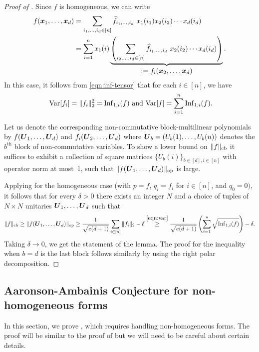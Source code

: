 \begin{proof}[Proof of ] 
Since $f$ is homogeneous, we can write
   \begin{align*}
    f(\boldsymbol{x}_1,\ldots, \boldsymbol{x}_d) &= \sum_{i_1, \ldots, i_d \in [n]} \widehat{f}_{i_1, \ldots, i_d} ~x_1(i_1)x_2(i_2)\cdots x_d({i_d}) \\
    \ & = \sum_{i=1}^n  x_1(i) \underbrace{\left(\sum_{i_2,\ldots, i_d \in [n]} \widehat{f}_{i_1, \ldots, i_d} ~x_2(i_2)\cdots x_d({i_d})\right)}_{\textstyle := f_i(\boldsymbol{x}_2,\ldots, \boldsymbol{x}_d)}.
\end{align*}
 In this case, it follows from \eqref{eqn:inf-tensor} that for each $i \in [n]$, we have 
 \begin{equation}\label{eqn:var}
     \ \mathrm{Var}[f_i] = \|f_i\|^2_2 = \mathrm{Inf}_{1,i}(f) \text{ and }  \mathrm{Var}[f] = \sum_{i=1}^n \mathrm{Inf}_{1,i}(f).
 \end{equation}

  Let us denote the corresponding non-commutative block-multilinear polynomials by $f(\boldsymbol{U}_1, \ldots, \boldsymbol{U}_d)$ and $f_i(\boldsymbol{U}_2, \ldots,\boldsymbol{U}_d)$ where $\boldsymbol{U}_b = (U_b(1), \ldots, U_b(n))$ denotes the $b^\text{th}$ block of non-commutative variables. To show a lower bound on $\|f\|_{\mathrm{cb}}$ it suffices to exhibit a collection of square matrices $\{U_b(i)\}_{b\in [d], i \in [n]}$ with operator norm at most~1, such that $\|f(\boldsymbol{U}_1, \ldots, \boldsymbol{U}_d)\|_{\mathrm{op}}$ is large. 
  
%  

Applying  for the homogeneous case (with $p = f$, $q_i=f_i$ for $i \in [n]$, and $q_0=0)$, it follows that for every $\delta > 0$ there exists an integer $N$ and a choice of tuples of $N \times N$ unitaries $\boldsymbol{U}_1, \ldots, \boldsymbol{U}_d$ such that  
      \[ \|f\|_{\mathrm{cb}} \ge \|f(\boldsymbol{U}_1, \ldots, \boldsymbol{U}_d)\|_{\mathrm{op}} \ge \frac1{\sqrt{e(d+1)}} \sum_{i\in [n]} \|f_i\|_2  -\delta \stackrel{\eqref{eqn:var}}{\ge}  \frac{1}{\sqrt{e(d+1)}} \left(\sum_{i=1}^n \sqrt{\mathrm{Inf}_{1,i}(f)} \right) -\delta.\]
Taking $\delta \to 0$, we get the statement of the lemma. The proof for the inequality when $b=d$ is the last block follows similarly by using the right polar decomposition.
\end{proof}

\subsection{Aaronson-Ambainis Conjecture for non-homogeneous forms}

In this section, we prove , which requires handling non-homogeneous forms. The proof will be similar to the proof of  but we will need to be careful about certain details. 

